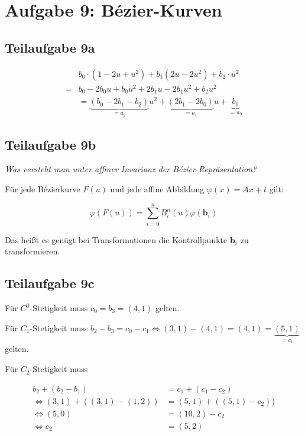 \documentclass[a4paper]{scrartcl}
\begin{document}
\section*{Aufgabe 9: Bézier-Kurven}
\subsection*{Teilaufgabe 9a}

\begin{align}
     & b_0 \cdot (1-2u + u^2) + b_1 (2u - 2u^2) + b_2 \cdot u^2\\
    =& b_0 - 2 b_0 u + b_0 u^2 + 2 b_1 u - 2 b_1 u^2 + b_2 u^2\\
    &= \underbrace{(b_0 - 2 b_1 - b_2)}_{= a_2} u^2  + \underbrace{(2 b_1 - 2 b_0)}_{= a_1} u + \underbrace{b_0}_{= a_0}
\end{align}

\subsection*{Teilaufgabe 9b}
\textit{Was versteht man unter affiner Invarianz der Bézier-Repräsentation?}

Für jede Bézierkurve $F(u)$ und jede affine Abbildung $\varphi(x) = A x + t$ gilt:

\[\varphi(F(u)) = \sum_{i=0}^n B_i^n(u) \varphi(\mathbf{b}_i)\]

Das heißt es genügt bei Transformationen die Kontrollpunkte $\mathbf{b}_i$
zu transformieren.

\subsection*{Teilaufgabe 9c}
Für $C^0$-Stetigkeit muss $c_0 = b_3 = (4, 1)$ gelten.

Für $C_1$-Stetigkeit muss $b_2 - b_3 = c_0 - c_1 \Leftrightarrow (3,1) - (4,1) = (4,1) = \underbrace{(5,1)}_{= c_1}$ gelten.

Für $C_2$-Stetigkeit muss

\begin{align}
    b_2 + (b_2 - b_1) &= c_1 + (c_1 - c_2)\\
    \Leftrightarrow (3,1) + ((3,1) - (1,2)) &= (5,1) + ((5,1) - c_2))\\
    \Leftrightarrow (5, 0) &= (10, 2) - c_2\\
    \Leftrightarrow c_2 &= (5, 2)\\
\end{align}
\end{document}
